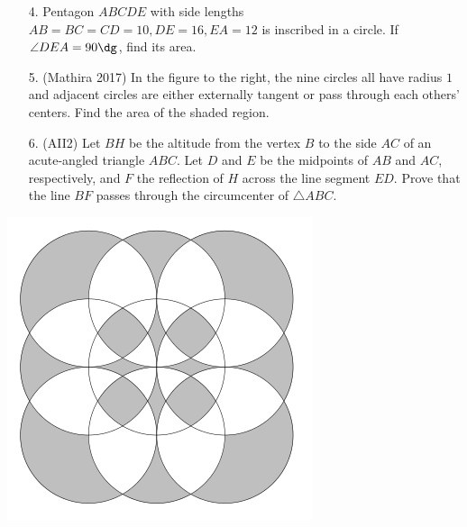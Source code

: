 \documentclass[10pt,paper=letter]{scrartcl}
\begin{document}
\noindent\begin{minipage}{.70\textwidth}
  \begin{enumerate}
    \item[4.] Pentagon $ABCDE$ with side lengths $AB = BC = CD = 10, DE = 16, EA = 12$ is inscribed in a circle. If $\angle DEA = 90\dg$, find its area.

    \item[5.] (Mathira 2017) In the figure to the right, the nine circles all have radius $1$ and adjacent circles are either externally tangent or pass through each others' centers. Find the area of the shaded region.

    \item[6.] (AII2) Let $BH$ be the altitude from the vertex $B$ to the side $AC$ of an acute-angled triangle $ABC$. Let $D$ and $E$ be the midpoints of $AB$ and $AC$, respectively, and $F$ the reflection of $H$ across the line segment $ED$. Prove that the line $BF$ passes through the circumcenter of $\triangle ABC$.
  \end{enumerate}
\end{minipage}
\begin{minipage}{.32\textwidth}
  \begin{center}
  \includegraphics[width=.90\textwidth]{w1math.png}
  \end{center}
\end{minipage}
\end{document}
